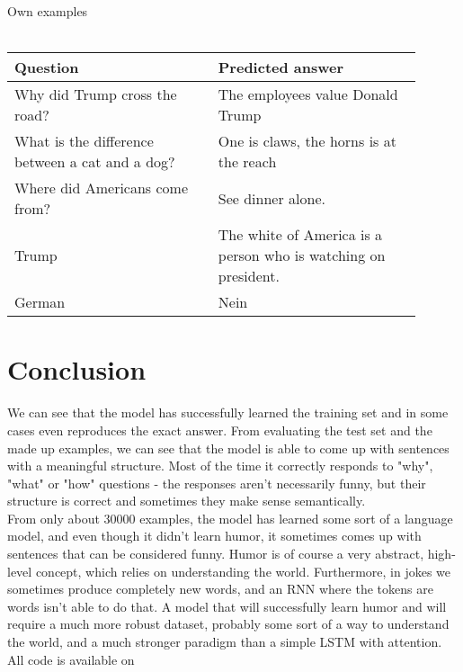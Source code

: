 \documentclass[12pt]{article}
\begin{document}
\vspace{1cm}
Own examples \\\\
\begin{tabular}{ |p{0.45\linewidth}|p{0.45\linewidth}| } 
         \hline
      \textbf{Question} & \textbf{Predicted answer} \\ 
     \hline
       Why did Trump cross the road? & The employees value Donald Trump \\ 
     \hline
       What is the difference between a cat and a dog? & One is claws, the horns is at the reach \\
     \hline
       Where did Americans come from? & See dinner alone. \\
     \hline
       Trump & The white of America is a person who is watching on president.\\
     \hline
       German & Nein \\
         \hline
\end{tabular}

\section{Conclusion}

We can see that the model has successfully learned the training set and in some cases even reproduces the exact answer. From evaluating the test set and the made up examples, we can see that the model is able to come up with sentences with a meaningful structure. Most of the time it correctly responds to "why", "what" or "how" questions - the responses aren't necessarily funny, but their structure is correct and sometimes they make sense semantically. \\

From only about 30000 examples, the model has learned some sort of a language model, and even though it didn't learn humor, it sometimes comes up with sentences that can be considered funny. Humor is of course a very abstract, high-level concept, which relies on understanding the world. Furthermore, in jokes we sometimes produce completely new words, and an RNN where the tokens are words isn't able to do that. A model that will successfully learn humor and will require a much more robust dataset, probably some sort of a way to understand the world, and a much stronger paradigm than a simple LSTM with attention.\\

All code is available on 
\end{document}
